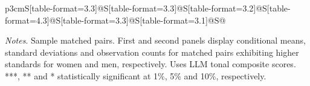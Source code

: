\begin{table}
\begin{threeparttable}
\begin{tabular}{p{3cm}S[table-format=3.3]@{}S[table-format=3.3]@{}S[table-format=3.2]@{}S[table-format=4.3]@{}S[table-format=3.3]@{}S[table-format=3.1]@{}S@{}}
            \bottomrule
        \end{tabular}
        \begin{tablenotes}
            \tiny
            \item \textit{Notes}. Sample matched pairs. First and second panels display conditional means, standard deviations and observation counts for matched pairs exhibiting higher standards for women and men, respectively. Uses LLM tonal composite scores. ***, ** and * statistically significant at 1\%, 5\% and 10\%, respectively.
        \end{tablenotes}
    \end{threeparttable}
\end{table}